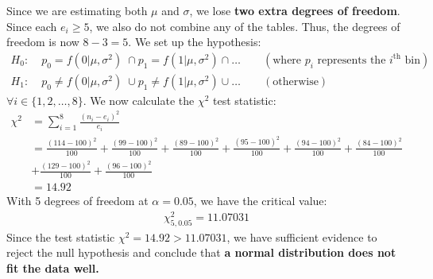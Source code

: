\documentclass[12pt]{article}
\begin{document}
Since we are estimating both $\mu$ and $\sigma$, we lose \textbf{two extra degrees of freedom}. Since each $e_i \geq 5$, we also do not combine any of the tables. Thus, the degrees of freedom is now $8-3 = 5$. We set up the hypothesis: \begin{align*}
    H_{0}: & \; p_{0} = f(0 | \mu, \sigma^{2}) \; \cap p_{1} = f(1 | \mu, \sigma^{2}) \cap \dots \qquad (\text{where } p_i \text{ represents the } i^{\text{th}} \text{ bin})\\ 
    H_{1}: & \; p_{0} \neq f(0 | \mu, \sigma^{2}) \; \cup p_{1} \neq  f(1 | \mu, \sigma^{2}) \cup \dots \qquad (\text{otherwise})
\end{align*} $\forall i \in \{1, 2, \dots , 8\}$. We now calculate the $\chi^{2}$ test statistic: \begin{align*}
    \chi^{2} &= \sum_{i=1}^{8} \frac{(n_i - e_i)^{2}}{e_i} \\ 
    &= \frac{(114-100)^{2}}{100} + \frac{(99-100)^{2}}{100} + \frac{(89 - 100)^{2}}{100} + \frac{(95-100)^{2}}{100} + \frac{(94 - 100)^{2}}{100} + \frac{(84 - 100)^{2}}{100} \\ 
    &+ \frac{(129-100)^{2}}{100} + \frac{(96 - 100)^{2}}{100} \\ 
    &= 14.92
\end{align*} With 5 degrees of freedom at $\alpha = 0.05$, we have the critical value: \begin{align*}
    \chi^{2}_{5, 0.05} = 11.07031
\end{align*} Since the test statistic $\chi^{2} = 14.92 > 11.07031$, we have sufficient evidence to reject the null hypothesis and conclude that \textbf{a normal distribution does not fit the data well.} 
\end{document}
